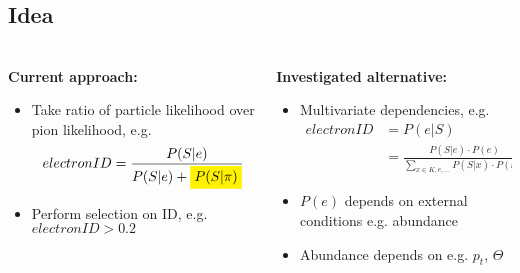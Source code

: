 \documentclass[aspectratio=169]{beamer}
\newcommand{\mathcolorbox}[2]{\colorbox{#1}{$\displaystyle #2$}}
\begin{document}
\subsection{Idea}
\begin{frame}
	\frametitle{\insertsection}
	\framesubtitle{\insertsubsection}

	\begin{columns}[T]
		\begin{column}{.49\textwidth}
			\textbf{Current approach:} \\
			\begin{itemize}
				\item Take ratio of particle likelihood over pion likelihood, e.g.
				\setlength\abovedisplayskip{0em}
				\begin{equation*}
					electronID = \frac{P(S|e)}{P(S|e) +\mathcolorbox{yellow}{P(S|\pi)}}
				\end{equation*}
				\setlength\belowdisplayshortskip{0em}
				\item Perform selection on ID, e.g. $electronID > 0.2$
			\end{itemize}
		\end{column}
		\begin{column}{.49\textwidth}
			\textbf{Investigated alternative:} \\
			\begin{itemize}
				\item Multivariate dependencies, e.g.
				\setlength\abovedisplayskip{0em}
				\begin{equation*}
					\begin{aligned}
						electronID &= P(e|S) \\
						&= \frac{P(S|e) \cdot P(e)}{\sum \limits_{x \in {K, e, \dots}} P(S|x) \cdot  P(x)}
					\end{aligned}
				\end{equation*}
				\setlength\belowdisplayshortskip{0em}
				\item $P(e)$ depends on external conditions e.g. abundance
				\item Abundance depends on e.g. $p_t$, $\Theta$
			\end{itemize}
		\end{column}
	\end{columns}
\end{frame}
\end{document}
